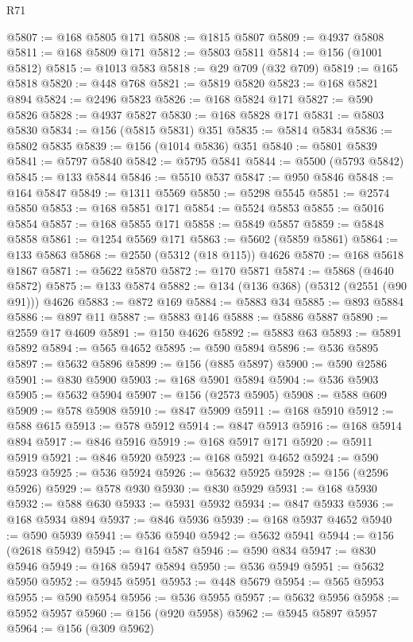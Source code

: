 \begin{lexlean}{R71}
\begin{coremodule}
@5807 := @168 @5805 @171
@5808 := @1815 @5807
@5809 := @4937 @5808
@5811 := @168 @5809 @171
@5812 := @5803 @5811
@5814 := @156 (@1001 @5812)
@5815 := @1013 @583
@5818 := @29 @709 (@32 @709)
@5819 := @165 @5818
@5820 := @448 @768
@5821 := @5819 @5820
@5823 := @168 @5821 @894
@5824 := @2496 @5823
@5826 := @168 @5824 @171
@5827 := @590 @5826
@5828 := @4937 @5827
@5830 := @168 @5828 @171
@5831 := @5803 @5830
@5834 := @156 (@5815 @5831) @351
@5835 := @5814 @5834
@5836 := @5802 @5835
@5839 := @156 (@1014 @5836) @351
@5840 := @5801 @5839
@5841 := @5797 @5840
@5842 := @5795 @5841
@5844 := @5500 (@5793 @5842)
@5845 := @133 @5844
@5846 := @5510 @537
@5847 := @950 @5846
@5848 := @164 @5847
@5849 := @1311 @5569
@5850 := @5298 @5545
@5851 := @2574 @5850
@5853 := @168 @5851 @171
@5854 := @5524 @5853
@5855 := @5016 @5854
@5857 := @168 @5855 @171
@5858 := @5849 @5857
@5859 := @5848 @5858
@5861 := @1254 @5569 @171
@5863 := @5602 (@5859 @5861)
@5864 := @133 @5863
@5868 := @2550 (@5312 (@18 @115)) @4626
@5870 := @168 @5618 @1867
@5871 := @5622 @5870
@5872 := @170 @5871
@5874 := @5868 (@4640 @5872)
@5875 := @133 @5874
@5882 := @134 (@136 @368) (@5312 (@2551 (@90 @91))) @4626
@5883 := @872 @169
@5884 := @5883 @34
@5885 := @893 @5884
@5886 := @897 @11
@5887 := @5883 @146
@5888 := @5886 @5887
@5890 := @2559 @17 @4609
@5891 := @150 @4626
@5892 := @5883 @63
@5893 := @5891 @5892
@5894 := @565 @4652
@5895 := @590 @5894
@5896 := @536 @5895
@5897 := @5632 @5896
@5899 := @156 (@885 @5897)
@5900 := @590 @2586
@5901 := @830 @5900
@5903 := @168 @5901 @5894
@5904 := @536 @5903
@5905 := @5632 @5904
@5907 := @156 (@2573 @5905)
@5908 := @588 @609
@5909 := @578 @5908
@5910 := @847 @5909
@5911 := @168 @5910
@5912 := @588 @615
@5913 := @578 @5912
@5914 := @847 @5913
@5916 := @168 @5914 @894
@5917 := @846 @5916
@5919 := @168 @5917 @171
@5920 := @5911 @5919
@5921 := @846 @5920
@5923 := @168 @5921 @4652
@5924 := @590 @5923
@5925 := @536 @5924
@5926 := @5632 @5925
@5928 := @156 (@2596 @5926)
@5929 := @578 @930
@5930 := @830 @5929
@5931 := @168 @5930
@5932 := @588 @630
@5933 := @5931 @5932
@5934 := @847 @5933
@5936 := @168 @5934 @894
@5937 := @846 @5936
@5939 := @168 @5937 @4652
@5940 := @590 @5939
@5941 := @536 @5940
@5942 := @5632 @5941
@5944 := @156 (@2618 @5942)
@5945 := @164 @587
@5946 := @590 @834
@5947 := @830 @5946
@5949 := @168 @5947 @5894
@5950 := @536 @5949
@5951 := @5632 @5950
@5952 := @5945 @5951
@5953 := @448 @5679
@5954 := @565 @5953
@5955 := @590 @5954
@5956 := @536 @5955
@5957 := @5632 @5956
@5958 := @5952 @5957
@5960 := @156 (@920 @5958)
@5962 := @5945 @5897 @5957
@5964 := @156 (@309 @5962)

\end{coremodule}
\end{lexlean}
